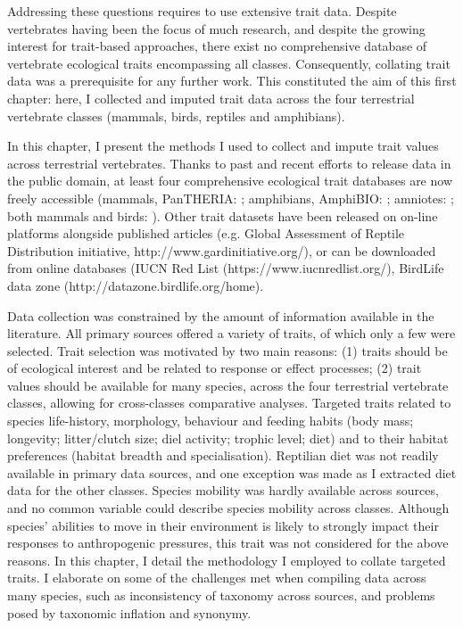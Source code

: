 Addressing these questions requires to use extensive trait data. Despite vertebrates having been the focus of much research, and despite the growing interest for trait-based approaches, there exist no comprehensive database of vertebrate ecological traits encompassing all classes. Consequently, collating trait data was a prerequisite for any further work. This constituted the aim of this first chapter: here, I collected and imputed trait data across the four terrestrial vertebrate classes (mammals, birds, reptiles and amphibians).

In this chapter, I present the methods I used to collect and impute trait values across terrestrial vertebrates. Thanks to past and recent efforts to release data in the public domain, at least four comprehensive ecological trait databases are now freely accessible (mammals, PanTHERIA: \cite{Jones2009}; amphibians, AmphiBIO: \cite{Oliveira2017}; amniotes: \cite{Myhrvold2015}; both mammals and birds: \cite{Cooke2019}). Other trait datasets have been released on on-line platforms alongside published articles (e.g. Global Assessment of Reptile Distribution initiative, http://www.gardinitiative.org/), or can be downloaded from online databases (IUCN Red List (https://www.iucnredlist.org/), BirdLife data zone (http://datazone.birdlife.org/home). 

Data collection was constrained by the amount of information available in the literature.  All  primary sources offered a variety of traits, of which only a few were selected. Trait selection was motivated by two main reasons: (1) traits should be of ecological interest and be related to response or effect processes; (2) trait values should be available for many species, across the four terrestrial vertebrate classes, allowing for cross-classes comparative analyses. Targeted traits related to species life-history, morphology, behaviour and feeding habits (body mass; longevity; litter/clutch size; diel activity; trophic level; diet) and to their habitat preferences (habitat breadth and specialisation). Reptilian diet was not readily available in primary data sources, and one exception was made as I extracted diet data for the other classes. Species mobility was hardly available across sources, and no common variable could describe species mobility across classes. Although species' abilities to move in their environment is likely to strongly impact their responses to anthropogenic pressures, this trait was not considered for the above reasons. In this chapter, I detail the methodology I employed to collate targeted traits. I elaborate on some of the challenges met when compiling data across many species, such as inconsistency of taxonomy across sources, and problems posed by taxonomic inflation and synonymy.

